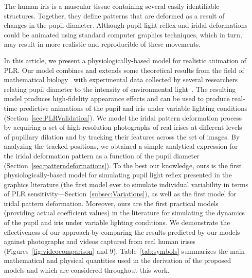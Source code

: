 \documentclass{dnacm} %
\begin{document}
The human iris is a muscular tissue containing several easily
identifiable structures. Together, they define patterns that are
deformed as a result of changes in the pupil diameter. Although pupil
light reflex and iridal deformations could be animated using standard
computer graphics techniques, which in turn, may result in more
realistic and reproducible of these movements.

In this article, we present a physiologically-based model for realistic
animation of PLR. Our model combines and extends some theoretical
results from the field of mathematical biology~\cite{CDFKMS-06} with
experimental data collected by several {researchers} relating pupil
diameter to the intensity of environmental
light~\cite{BCHH:Collewijn:1988}. The resulting model produces
high-fidelity appearance effects and can be used to produce real-time
predictive animations of the pupil and iris under variable lighting
conditions (Section~\ref{sec:PLRValidation}). We model the iridal
pattern deformation process by acquiring a set of high-resolution
photographs of real irises at different levels of pupillary dilation and
by tracking their features across the set of images. By analyzing the
tracked positions, we obtained a simple analytical expression for the
iridal deformation pattern as a function of the pupil diameter
(Section~\ref{sec:patterndeformations}). To the best our knowledge, ours
is the first physiologically-based model for simulating pupil light
reflex presented in the graphics literature (the first model ever to
simulate individual variability in terms of PLR
sensitivity---Section~\ref{subsec:Variations}), as well as the first
model for iridal pattern deformation. Moreover, ours are the first
practical models (providing actual coefficient values) in the literature
for simulating the dynamics of the pupil and iris under variable
lighting conditions. We demonstrate the effectiveness of our approach by
comparing the results predicted by our models against photographs and
videos captured from real human irises
(Figures~\ref{fig:videocomparison} and 9). Table~\ref{tab:symbols}
summarizes the main mathematical and physical quantities used in the
derivation of the proposed models and which are considered throughout
this work.
\end{document}
